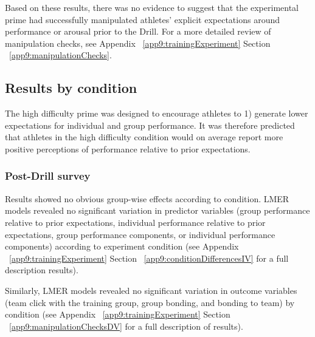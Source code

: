 Based on these results, there was no evidence to suggest that the experimental prime had successfully manipulated athletes' explicit expectations around performance or arousal prior to the Drill.  For a more detailed review of manipulation checks, see Appendix ~\ref{app9:trainingExperiment} Section ~\ref{app9:manipulationChecks}.













\subsection{Results by condition}

The high difficulty prime was designed to encourage athletes to 1) generate lower expectations for individual and group performance. It was therefore predicted that athletes in the high difficulty condition would on average report more positive perceptions of performance relative to prior expectations.


\subsubsection{Post-Drill survey}

Results showed no obvious group-wise effects according to condition.  LMER models revealed no significant variation in predictor variables (group performance relative to prior expectations, individual performance relative to prior expectations, group performance components, or individual performance components) according to experiment condition (see Appendix ~\ref{app9:trainingExperiment} Section ~\ref{app9:conditionDifferencesIV} for a full description results).

Similarly, LMER models revealed no significant variation in outcome variables (team click with the training group, group bonding, and bonding to team) by condition (see Appendix ~\ref{app9:trainingExperiment} Section ~\ref{app9:manipulationChecksDV} for a full description of results).


